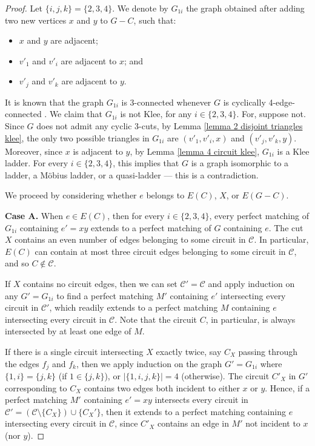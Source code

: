 \documentclass[]{theclass}
\begin{document}
\begin{proof}
Let $\{i,j,k\}=\{2,3,4\}$. We denote by $G_{1i}$ the graph obtained after adding two new vertices $x$ and $y$ to $G-C$, such that:
\begin{itemize}
    \item $x$ and $y$ are adjacent; 
    \item $v'_1$ and $v'_i$ are adjacent to $x$; and
    \item $v'_j$ and $v'_k$ are adjacent to $y$.
\end{itemize} 

It is known that the graph $G_{1i}$ is 3-connected whenever $G$ is cyclically 4-edge-connected \cite{EKK}.
We claim that $G_{1i}$ is not Klee, for any $i\in\{2,3,4\}$. For, suppose not. Since $G$ does not admit any cyclic 3-cuts, by Lemma \ref{lemma 2 disjoint triangles klee}, the only two possible triangles in $G_{1i}$ are $(v'_1,v'_i,x)$ and $(v'_j,v'_k,y)$. Moreover, since $x$ is adjacent to $y$, by Lemma \ref{lemma 4 circuit klee}, $G_{1i}$ is a Klee ladder. For every $i\in\{2,3,4\}$, this implies that $G$ is a graph isomorphic to a ladder, a M\"obius ladder, or a quasi-ladder  --- this is a contradiction. 

We proceed by considering whether $e$ belongs to $E(C)$, $X$, or $E(G-C)$.

\textbf{Case A.} When $e\in E(C)$, then for every $i\in\{2,3,4\}$, every perfect matching of $G_{1i}$ containing $e'=xy$ extends to a perfect matching of $G$ containing $e$. The cut $X$ contains an even number of edges belonging to some circuit in $\mathcal{C}$. In particular, $E(C)$ can contain at most three circuit edges belonging to some circuit in $\mathcal{C}$, and so $C\not\in\mathcal{C}$.

If $X$ contains no circuit edges, then we can set $\mathcal{C}'=\mathcal{C}$ and apply induction on any $G'=G_{1i}$ to find a perfect matching $M'$ containing $e'$ intersecting every circuit in $\mathcal{C}'$, which readily extends to a perfect matching $M$ containing $e$ intersecting every circuit in $\mathcal{C}$. Note that the circuit $C$, in particular, is always intersected by at least one edge of $M$.

If there is a single circuit intersecting $X$ exactly twice, say $C_X$ passing through the edges $f_j$ and $f_k$, then we apply induction on the graph $G'=G_{1i}$ where $\{1,i\}=\{j,k\}$ (if $1\in\{j,k\}$), or $|\{1,i,j,k\}|=4$ (otherwise). The circuit $C'_X$ in $G'$ corresponding to $C_X$ contains two edges both incident to either $x$ or $y$. Hence, if a perfect matching $M'$ containing $e'=xy$ intersects every circuit in $\mathcal{C'}=(\mathcal{C}\setminus \{C_X\}) \cup \{C_X'\}$, then it extends to a perfect matching containing $e$ intersecting every circuit in $\mathcal{C}$, since $C'_X$ contains an edge in $M'$ not incident to $x$ (nor $y$).


\end{proof}
\end{document}
